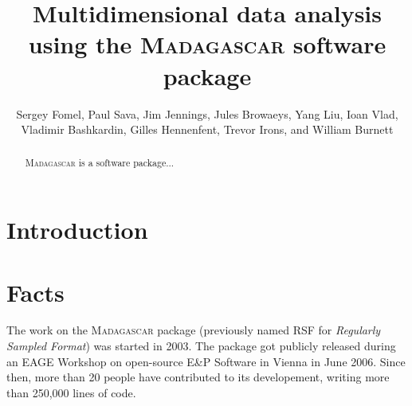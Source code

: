 \title{Multidimensional data analysis \\ using the \textsc{Madagascar} software package}

\renewcommand{\thefootnote}{\fnsymbol{footnote}} 

\author{Sergey Fomel\footnotemark[1], Paul Sava\footnotemark[2], Jim Jennings, Jules Browaeys, Yang Liu\footnotemark[1], Ioan Vlad, Vladimir Bashkardin\footnotemark[1],  Gilles Hennenfent, Trevor Irons, and William Burnett\footnotemark[1]}


\address{
\footnotemark[1]Bureau of Economic Geology, \\
John A. and Katherine G. Jackson School of Geosciences \\
The University of Texas at Austin \\
University Station, Box X \\
Austin, TX 78713-8972 \\
\footnotemark[2] Center for Wave Phenomena \\
Department of Geophysics \\
Colorado School of Mines \\
Golden, CO 80401}


\maketitle

\begin{abstract}
  \textsc{Madagascar} is a software package...
\end{abstract}

\section{Introduction}

\section{Facts}

The work on the \textsc{Madagascar} package (previously named RSF for \emph{Regularly
Sampled Format}) was started in 2003.  The package got
publicly released during an EAGE Workshop on open-source E\&P Software
in Vienna in June 2006. Since then, more than 20 people have
contributed to its developement, writing more than 250,000 lines of code.

